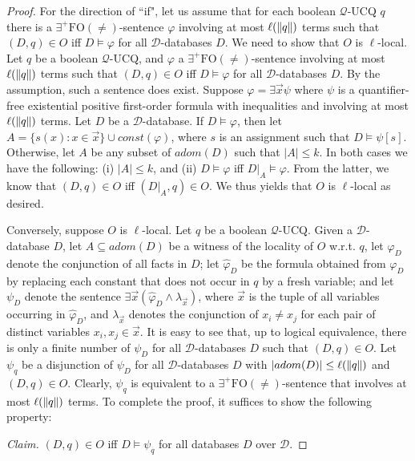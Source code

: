 \documentclass[letterpaper]{article} %
\theoremstyle{definition}
\theoremstyle{remark}
\theoremstyle{definition}
\begin{document}
\begin{proof} 
For the direction of ``if", let us assume that for each boolean $\mathscr{Q}$-UCQ $q$ there is a $\exists^+\text{FO}(\ne)$-sentence $\varphi$ involving at most $\ell(\dl {q}\dl )$ terms such that $(D,q)\in O$ iff $D\models\varphi$ for all $\mathscr{D}$-databases $D$. We need to show that $O$ is $\ell$-local. Let $q$ be a boolean $\mathscr{Q}$-UCQ, and $\varphi$ a $\exists^+\text{FO}(\ne)$-sentence involving at most $\ell(\dl {q}\dl )$ terms such that $(D,q)\in O$ iff $D\models\varphi$ for all $\mathscr{D}$-databases $D$. By the assumption, such a sentence does exist. Suppose $\varphi=\exists \vec{x}\psi$ where $\psi$ is a quantifier-free existential positive first-order formula with inequalities and involving at most $\ell(\dl q\dl)$ terms. Let $D$ be a $\mathscr{D}$-database. If $D\models\varphi$, then let $A=\{s(x):x\in\vec{x}\}\cup const(\varphi)$, where $s$ is an assignment such that $D\models\psi[s]$. Otherwise, let $A$ be any subset of $adom(D)$ such that $|A|\le k$. In both cases we have the following: (i) $|A|\le k$, and (ii) $D\models\varphi$ iff $D|_A\models\varphi$. From the latter, we know that $(D,q)\in O$ iff $(D|_A,q)\in O$. We thus yields that $O$ is $\ell$-local as desired.

Conversely, suppose $O$ is $\ell$-local. Let $q$ be a boolean $\mathscr{Q}$-UCQ. Given a $\mathscr{D}$-database $D$, let $A\subseteq adom(D)$ be a witness of the locality of $O$ w.r.t. $q$, let $\varphi_D$ denote the conjunction of all facts in $D$; let $\hat{\varphi}_D$ be the formula obtained from $\varphi_D$ by replacing each constant that does not occur in ${q}$ by a fresh variable; and let $\psi_D$ denote the sentence $\exists\vec{x}(\hat{\varphi}_D\wedge\lambda_{\vec{x}})$, where $\vec{x}$ is the tuple of all variables occurring in $\hat{\varphi}_D$, and $\lambda_{\vec{x}}$ denotes the conjunction of $x_i\ne x_j$ for each pair of distinct variables $x_i,x_j\in\vec{x}$. It is easy to see that, up to logical equivalence, there is only a finite number of $\psi_D$ for all $\mathscr{D}$-databases $D$ such that $(D,q)\in O$. Let $\psi_{q}$ be a disjunction of $\psi_D$ for all $\mathscr{D}$-databases $D$ with $|adom(D)|\le\ell(\dl {q}\dl )$ and $(D,q)\in O$. Clearly, $\psi_q$ is equivalent to a $\exists^+\text{FO}(\ne)$-sentence that involves at most $\ell(\dl {q}\dl )$ terms. To complete the proof, it suffices to show the following property:

\medskip
{\noindent\em Claim.} $(D,{q})\in O$ iff $D\models\psi_{q}$ for all databases $D$ over $\mathscr{D}$.
\medskip


\end{proof}
\end{document}
